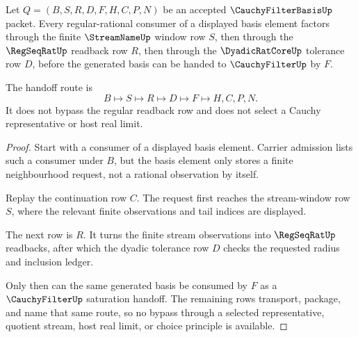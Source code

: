 \begin{theorem}
\label{thm:cauchy-filter-basis-regseqrat-handoff}
Let $Q=(B,S,R,D,F,H,C,P,N)$ be an accepted $\CauchyFilterBasisUp$ packet. Every regular-rational consumer of a displayed basis element factors through the finite $\StreamNameUp$ window row $S$, then through the $\RegSeqRatUp$ readback row $R$, then through the $\DyadicRatCoreUp$ tolerance row $D$, before the generated basis can be handed to $\CauchyFilterUp$ by $F$.

The handoff route is
$$
B \longmapsto S \longmapsto R \longmapsto D \longmapsto F \longmapsto H,C,P,N .
$$
It does not bypass the regular readback row and does not select a Cauchy representative or host real limit.
\end{theorem}
\begin{proof}
Start with a consumer of a displayed basis element. Carrier admission lists such a consumer under $B$, but the basis element only stores a finite neighbourhood request, not a rational observation by itself.

Replay the continuation row $C$. The request first reaches the stream-window row $S$, where the relevant finite observations and tail indices are displayed.

The next row is $R$. It turns the finite stream observations into $\RegSeqRatUp$ readbacks, after which the dyadic tolerance row $D$ checks the requested radius and inclusion ledger.

Only then can the same generated basis be consumed by $F$ as a $\CauchyFilterUp$ saturation handoff. The remaining rows transport, package, and name that same route, so no bypass through a selected representative, quotient stream, host real limit, or choice principle is available.
\end{proof}

